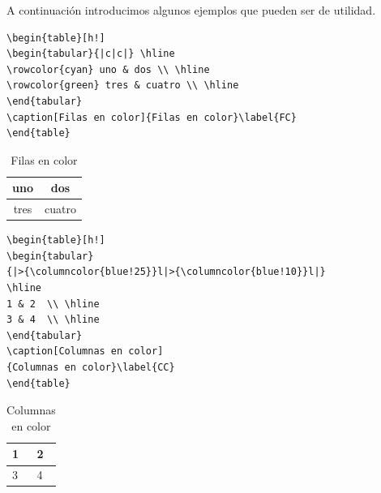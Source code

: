 \documentclass[10pt,a4paper]{article}
\begin{document}
\bigskip

A continuación introducimos algunos ejemplos que pueden ser de utilidad.



\begin{table}[!ht]
\centering
\begin{minipage}{0.6\textwidth}
\begin{verbatim}
\begin{table}[h!]
\begin{tabular}{|c|c|} \hline
\rowcolor{cyan} uno & dos \\ \hline
\rowcolor{green} tres & cuatro \\ \hline
\end{tabular}
\caption[Filas en color]{Filas en color}\label{FC}
\end{table}
\end{verbatim}
\end{minipage}
\begin{minipage}{0.3\textwidth}
\centering
\begin{tabular}{|c|c|} \hline
\rowcolor{cyan} uno & dos \\ \hline
\rowcolor{green} tres & cuatro \\ \hline
\end{tabular}
\caption[Filas en color]{Filas en color}\label{FC}
\end{minipage}
\end{table}

\medskip

\begin{table}[!ht]
\centering
\begin{minipage}{0.7\textwidth}
\begin{verbatim}
\begin{table}[h!]
\begin{tabular}
{|>{\columncolor{blue!25}}l|>{\columncolor{blue!10}}l|}
\hline
1 & 2  \\ \hline
3 & 4  \\ \hline
\end{tabular}
\caption[Columnas en color]
{Columnas en color}\label{CC}
\end{table}
\end{verbatim}
\end{minipage}
\begin{minipage}{0.2\textwidth}
\centering
\begin{tabular}
{|>{\columncolor{blue!25}}l|>{\columncolor{blue!10}}l|}
\hline
1 & 2  \\ \hline
3 & 4 \\ \hline
\end{tabular}
\caption[Columnas en color]
{Columnas en color}\label{CC}
\end{minipage}
\end{table}
\end{document}
